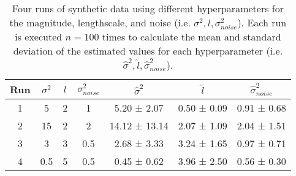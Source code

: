 \documentclass[11pt]{article}
\begin{document}
\begin{table}
\begin{tabular}{c|ccc|ccc}
    \hline
    Run & $\sigma^2$ & $l$ & $\sigma_{noise}^2$ & $\hat{\sigma}^2$ & $\hat{l}$ & $\hat{\sigma}_{noise}^2$ \\
    \hline
    1 & 5 & 2 & 1 & 5.20 ± 2.07 & 0.50 ± 0.09 & 0.91 ± 0.68 \\
    2 & 15 & 2 & 2 & 14.12 ± 13.14 & 2.07 ± 1.09 & 2.04 ± 1.51 \\
    3 & 3 & 3 & 0.5 & 2.68 ± 3.33 & 3.24 ± 1.65 & 0.97 ± 0.71 \\
    4 & 0.5 & 5 & 0.5 & 0.45 ± 0.62 & 3.96 ± 2.50 & 0.56 ± 0.30 \\
    \hline
\end{tabular}
\caption{\label{exp1table}Four runs of synthetic data using different hyperparameters for the magnitude, lengthscale, and noise (i.e. $\sigma^2,l,\sigma_{noise}^2$). Each run is executed $n=100$ times to calculate the mean and standard deviation of the estimated values for each hyperparameter (i.e. $\hat{\sigma}^2,\hat{l},\hat{\sigma}_{noise}^2$).}
\end{table}
\end{document}
